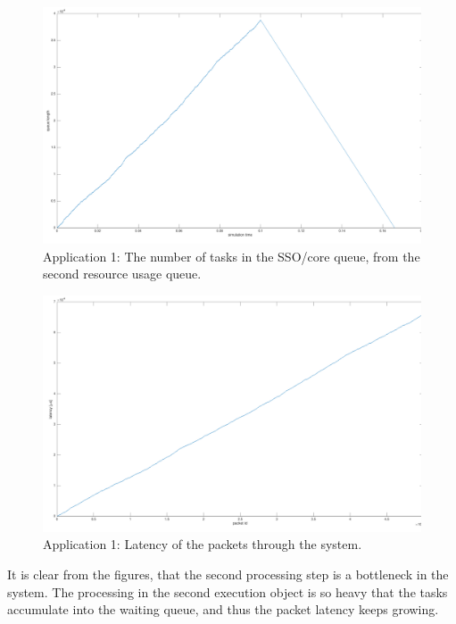 \begin{figure}[]
  \begin{center}
    \includegraphics[width=\textwidth]{images/app1-queue2.pdf}
    \caption{Application 1: The number of tasks in the SSO/core queue, from the second resource usage queue.}
    \label{fig:app1-queue2}
  \end{center}
\end{figure}

\begin{figure}[]
  \begin{center}
    \includegraphics[width=\textwidth]{images/app1-latency.pdf}
    \caption{Application 1: Latency of the packets through the system.}
    \label{fig:app1-latency}
  \end{center}
\end{figure}

It is clear from the figures, that the second processing step is a bottleneck in the system. The processing in the second execution object is so heavy that the tasks accumulate into the waiting queue, and thus the packet latency keeps growing.

